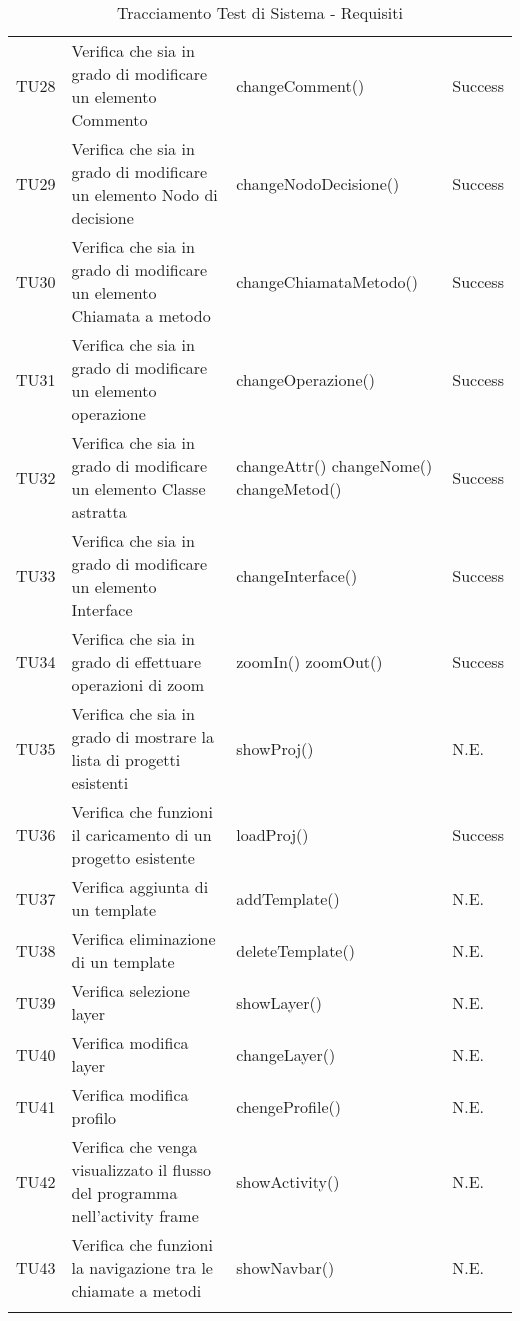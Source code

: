 \begin{longtable}{p{2cm}!{\VRule[1pt]}p{5cm}!{\VRule[1pt]}p{4.5cm}!{\VRule[1pt]}p{1.5cm}}
TU28 & Verifica che sia in grado di modificare un elemento Commento & changeComment() & Success  \\ 
TU29 & Verifica che sia in grado di modificare un elemento Nodo di decisione & changeNodoDecisione() & Success  \\ 
TU30 & Verifica che sia in grado di modificare un elemento Chiamata a metodo & changeChiamataMetodo() & Success  \\ 
TU31 & Verifica che sia in grado di modificare un elemento operazione & changeOperazione() & Success  \\ 
TU32 & Verifica che sia in grado di modificare un elemento Classe astratta & changeAttr() \newline changeNome() \newline changeMetod() & Success  \\ 
TU33 & Verifica che sia in grado di modificare un elemento Interface & changeInterface() & Success  \\ 
TU34 & Verifica che sia in grado di effettuare operazioni di zoom & zoomIn() \newline zoomOut() & Success  \\ 
TU35 & Verifica che sia in grado di mostrare la lista di progetti esistenti & showProj() & N.E. \\ 
TU36 & Verifica che funzioni il caricamento di un progetto esistente & loadProj() & Success  \\ 
TU37 & Verifica aggiunta di un template & addTemplate() & N.E. \\ 
TU38 & Verifica eliminazione di un template & deleteTemplate() & N.E. \\ 
TU39 & Verifica selezione layer & showLayer() & N.E. \\ 
TU40 & Verifica modifica layer & changeLayer() & N.E. \\ 
TU41 & Verifica modifica profilo & chengeProfile() & N.E. \\ 
TU42 & Verifica che venga visualizzato il flusso del programma nell’activity frame & showActivity() & N.E. \\ 
TU43 & Verifica che funzioni la navigazione tra le chiamate a metodi & showNavbar() & N.E. \\ 





\caption{Tracciamento Test di Sistema - Requisiti}
\end{longtable}